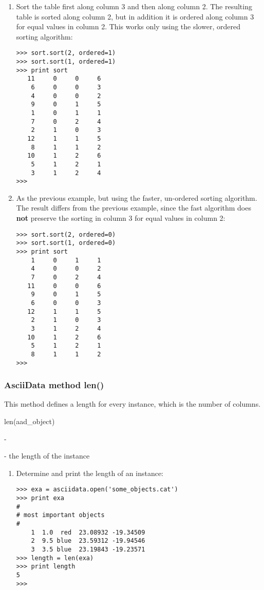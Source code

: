 \begin{enumerate}
\item Sort the table first along column 3 and then along column 2. The
resulting table is sorted along column 2, but in addition it is
ordered along column 3 for equal values in column 2.
This works only using the slower, ordered sorting algorithm:
\begin{small}
\begin{verbatim}
>>> sort.sort(2, ordered=1)
>>> sort.sort(1, ordered=1)
>>> print sort
   11     0     0     6
    6     0     0     3
    4     0     0     2
    9     0     1     5
    1     0     1     1
    7     0     2     4
    2     1     0     3
   12     1     1     5
    8     1     1     2
   10     1     2     6
    5     1     2     1
    3     1     2     4
>>>
\end{verbatim}
\end{small}
\item As the previous example, but using the faster, un-ordered sorting
algorithm. The result differs from the previous example, since the fast
algorithm does {\bf not} preserve the sorting in column 3 for equal values in
column 2:
\begin{small}
\begin{verbatim}
>>> sort.sort(2, ordered=0)
>>> sort.sort(1, ordered=0)
>>> print sort
    1     0     1     1
    4     0     0     2
    7     0     2     4
   11     0     0     6
    9     0     1     5
    6     0     0     3
   12     1     1     5
    2     1     0     3
    3     1     2     4
   10     1     2     6
    5     1     2     1
    8     1     1     2
>>>
\end{verbatim}
\end{small}
\end{enumerate}

\subsubsection{AsciiData method len()}
\label{adm_len}
%
This method defines a length for every \ad instance, which is the number
of columns.

len(aad\_object)

-

- the length of the \ad instance

\begin{enumerate}
\item Determine and print the length of an \ad instance:
\begin{small}
\begin{verbatim}
>>> exa = asciidata.open('some_objects.cat')
>>> print exa
#
# most important objects
#
    1  1.0  red  23.08932 -19.34509
    2  9.5 blue  23.59312 -19.94546
    3  3.5 blue  23.19843 -19.23571
>>> length = len(exa)
>>> print length
5
>>>
\end{verbatim}
\end{small}
\end{enumerate}

